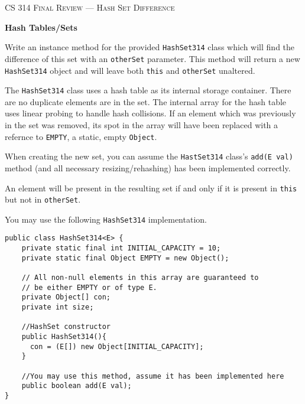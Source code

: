 \documentclass[12pt,letter]{article}
\begin{document}
\noindent\textsc{\large CS 314 Final Review --- Hash Set Difference}

\vspace{6pt}
\noindent\textbf{Hash Tables/Sets}

\vspace{2pt}
\noindent Write an instance method for the provided \texttt{HashSet314} class which will find the difference of this set with an \texttt{otherSet} 
parameter. This method will return a new \texttt{HashSet314} object and will leave both \texttt{this} and \texttt{otherSet} unaltered. 

\vspace{2pt}

\noindent The \texttt{HashSet314} class uses a hash table as its internal storage container. There are no duplicate elements are in the set.
The internal array for the hash table uses linear probing to handle hash collisions. If an element which was previously in the set was removed, its spot
in the array will have been replaced with a refernce to \texttt{EMPTY}, a static, empty \texttt{Object}.

\vspace{2pt}

\noindent When creating the new set, you can assume the \texttt{HastSet314} class's \texttt{add(E val)} method (and all necessary resizing/rehashing) has been implemented correctly.

\vspace{2pt}

\noindent An element will be present in the resulting set if and only if it is present in \texttt{this} but not in \texttt{otherSet}.

\vspace{4pt}

\vspace{6pt}
\noindent You may use the following \texttt{HashSet314} implementation.
\begin{verbatim}
public class HashSet314<E> {
    private static final int INITIAL_CAPACITY = 10;
    private static final Object EMPTY = new Object();

    // All non-null elements in this array are guaranteed to 
    // be either EMPTY or of type E.
    private Object[] con;
    private int size;

    //HashSet constructor
    public HashSet314(){
      con = (E[]) new Object[INITIAL_CAPACITY];
    }

    //You may use this method, assume it has been implemented here
    public boolean add(E val);
}
\end{verbatim}
\end{document}
